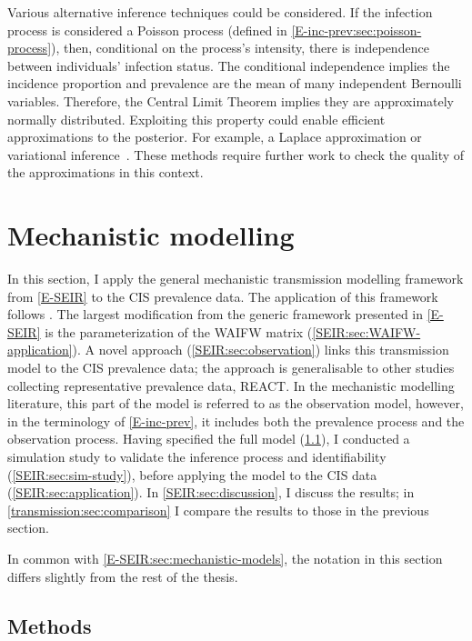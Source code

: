 \documentclass[thesis.tex]{subfiles}
\begin{document}
Various alternative inference techniques could be considered.
If the infection process is considered a Poisson process (defined in \cref{E-inc-prev:sec:poisson-process}), then, conditional on the process's intensity, there is independence between individuals' infection status.
The conditional independence implies the incidence proportion and prevalence are the mean of many independent Bernoulli variables.
Therefore, the Central Limit Theorem implies they are approximately normally distributed.
Exploiting this property could enable efficient approximations to the posterior.
For example, a Laplace approximation or variational inference~\autocite{bleiVariational}.
These methods require further work to check the quality of the approximations in this context.


\section{Mechanistic modelling} \label{SEIR}

In this section, I apply the general mechanistic transmission modelling framework from \cref{E-SEIR} to the CIS prevalence data.
The application of this framework follows \textcite{birrellRealtime}.
The largest modification from the generic framework presented in \cref{E-SEIR} is the parameterization of the WAIFW matrix (\cref{SEIR:sec:WAIFW-application}).
A novel approach (\cref{SEIR:sec:observation}) links this transmission model to the CIS prevalence data; the approach is generalisable to other studies collecting representative prevalence data, \eg REACT.
In the mechanistic modelling literature, this part of the model is referred to as the observation model, however, in the terminology of \cref{E-inc-prev}, it includes both the prevalence process and the observation process.
Having specified the full model (\cref{SEIR:sec:methods-application}), I conducted a simulation study to validate the inference process and identifiability (\cref{SEIR:sec:sim-study}), before applying the model to the CIS data (\cref{SEIR:sec:application}).
In \cref{SEIR:sec:discussion}, I discuss the results; in \cref{transmission:sec:comparison} I compare the results to those in the previous section.

In common with \cref{E-SEIR:sec:mechanistic-models}, the notation in this section differs slightly from the rest of the thesis.

\subsection{Methods} \label{SEIR:sec:methods-application}
\end{document}

